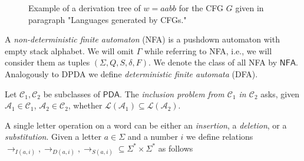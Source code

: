 \documentclass{CSML}
\newcommand{\aut}{\mathcal{A}}
\newcommand{\class}{\mathcal{C}}
\newcommand{\NFA}{\mathsf{NFA}}
\newcommand{\PDA}{\mathsf{PDA}}
\newcommand{\lang}{\mathcal{L}}
\begin{document}
\begin{figure}
\center
{}
\caption{\label{fig:ex}Example of a derivation tree of $w=aabb$ for the CFG $G$ given in paragraph "Languages generated by CFGs."}
\end{figure}




 A \emph{non-deterministic finite automaton} (NFA) is 
a pushdown automaton with empty stack alphabet. We will omit $\Gamma$ while referring to 
NFA, i.e., we will consider them as tuples $(\Sigma, Q, S, \delta, F)$.
We denote the class of all NFA by $\NFA$.
Analogously to DPDA we define \emph{deterministic finite automata} (DFA).

 Let $\class_1, \class_2$ be subclasses of $\PDA$. 
The \emph{inclusion problem from $\class_1$ in $\class_2$} asks, 
given $\aut_1 \in \class_1$, $\aut_2 \in \class_2$, whether $\lang(\aut_1) \subseteq \lang(\aut_2)$.


A single letter operation on a word can be either an {\em insertion}, a {\em deletion}, or a {\em substitution}.
Given a  letter $a\in \Sigma$ and a number $i$ we define relations $\rightarrow_{I(a,i)}, \rightarrow_{D(a,i)},
\rightarrow_{S(a,i)} \subseteq \Sigma^*\times \Sigma^*$ as follows
\end{document}
